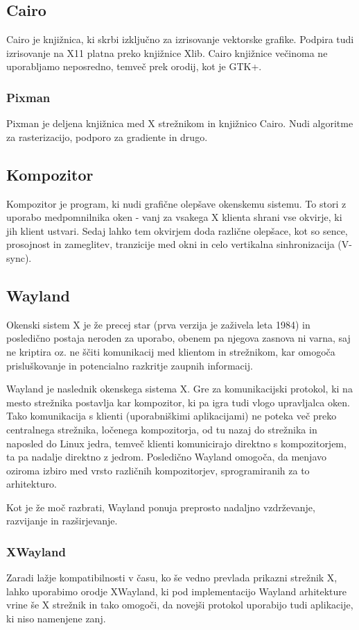 \documentclass{article}
\begin{document}
\subsection{Cairo}
Cairo je knjižnica, ki skrbi izključno za izrisovanje vektorske grafike. Podpira tudi izrisovanje na X11 platna preko knjižnice Xlib. Cairo knjižnice večinoma ne uporabljamo neposredno, temveč prek orodij, kot je GTK+.

\subsubsection{Pixman}
Pixman je deljena knjižnica med X strežnikom in knjižnico Cairo. Nudi algoritme za rasterizacijo, podporo za gradiente in drugo.

\subsection{Kompozitor}
Kompozitor je program, ki nudi grafične olepšave okenskemu sistemu. To stori z uporabo medpomnilnika oken - vanj za vsakega X klienta shrani vse okvirje, ki jih klient ustvari. Sedaj lahko tem okvirjem doda različne olepšace, kot so sence, prosojnost in zameglitev, tranzicije med okni in celo vertikalna sinhronizacija (V-sync).

\subsection{Wayland}
Okenski sistem X je že precej star (prva verzija je zaživela leta 1984) in posledično postaja neroden za uporabo, obenem pa njegova zasnova ni varna, saj ne kriptira oz. ne ščiti komunikacij med klientom in strežnikom, kar omogoča prisluškovanje in potencialno razkritje zaupnih informacij.

Wayland je naslednik okenskega sistema X. Gre za komunikacijski protokol, ki na mesto strežnika postavlja kar kompozitor, ki pa igra tudi vlogo upravljalca oken. Tako komunikacija s klienti (uporabniškimi aplikacijami) ne poteka več preko centralnega strežnika, ločenega kompozitorja, od tu nazaj do strežnika in naposled do Linux jedra, temveč klienti komunicirajo direktno s kompozitorjem, ta pa nadalje direktno z jedrom.
Posledično Wayland omogoča, da menjavo oziroma izbiro med vrsto različnih kompozitorjev, sprogramiranih za to arhitekturo.

Kot je že moč razbrati, Wayland ponuja preprosto nadaljno vzdrževanje, razvijanje in razširjevanje.

\subsubsection{XWayland}
Zaradi lažje kompatibilnosti v času, ko še vedno prevlada prikazni strežnik X, lahko uporabimo orodje XWayland, ki pod implementacijo Wayland arhitekture vrine še X strežnik in tako omogoči, da novejši protokol uporabijo tudi aplikacije, ki niso namenjene zanj.
\end{document}
